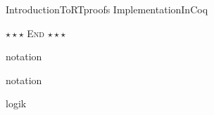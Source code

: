 \documentclass[11pt, a4paper, twoside, bibliography=totoc]{scrartcl}
\begin{document}

	


\clearpage



\cleardoublepage


\cleardoublepage











{IntroductionToRTproofs}
{ImplementationInCoq}











\begin{center}
\mbox{}
\vfill
$\star \star \star$ \textsc{End} $\star \star \star$
\end{center}

\cleardoublepage
\appendix





{notation} %

{notation}

\cleardoublepage

{logik}

\cleardoublepage
\end{document}
